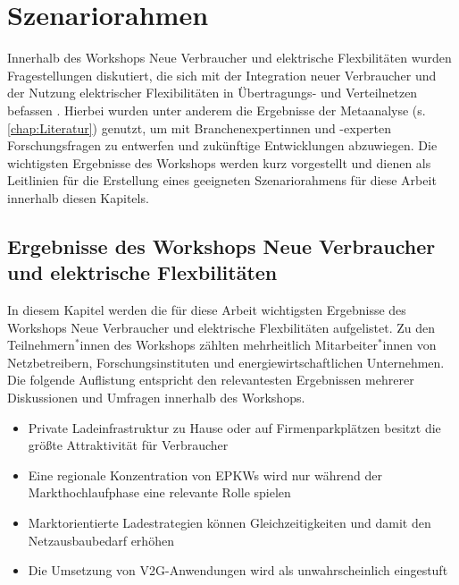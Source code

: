 
\section{Szenariorahmen}\label{chap:Szenariorahmen}

Innerhalb des Workshops \glqq Neue Verbraucher und elektrische Flexbilitäten\grqq{} wurden Fragestellungen diskutiert, die sich mit der Integration neuer Verbraucher und der Nutzung elektrischer Flexibilitäten in Übertragungs- und Verteilnetzen befassen \cite{RLI2020}.
Hierbei wurden unter anderem die Ergebnisse der Metaanalyse (s. \autoref{chap:Literatur}) genutzt, um mit Branchenexpertinnen und -experten Forschungsfragen zu entwerfen und zukünftige Entwicklungen abzuwiegen.
Die wichtigsten Ergebnisse des Workshops werden kurz vorgestellt und dienen als Leitlinien für die Erstellung eines geeigneten Szenariorahmens für diese Arbeit innerhalb diesen Kapitels.


\subsection{Ergebnisse des Workshops \glqq Neue Verbraucher und elektrische Flexbilitäten\grqq{}}

In diesem Kapitel werden die für diese Arbeit wichtigsten Ergebnisse des Workshops \glqq Neue Verbraucher und elektrische Flexbilitäten\grqq{} aufgelistet.
Zu den Teilnehmern$^*$innen des Workshops zählten mehrheitlich Mitarbeiter$^*$innen von Netzbetreibern, Forschungsinstituten und energiewirtschaftlichen Unternehmen.
Die folgende Auflistung entspricht den relevantesten Ergebnissen mehrerer Diskussionen und Umfragen innerhalb des Workshops.

\begin{itemize}
	\item Private Ladeinfrastruktur zu Hause oder auf Firmenparkplätzen besitzt die größte Attraktivität für Verbraucher
	\item Eine regionale Konzentration von \glspl{EPKW} wird nur während der Markthochlaufphase eine relevante Rolle spielen
	\item Marktorientierte Ladestrategien können Gleichzeitigkeiten und damit den Netzausbaubedarf erhöhen
	\item Die Umsetzung von \gls{V2G}-Anwendungen wird als unwahrscheinlich eingestuft
	
\end{itemize}


